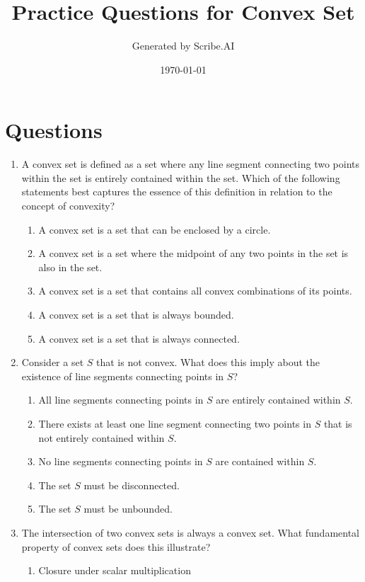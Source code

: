 \documentclass{article}%
\title{Practice Questions for Convex Set}%
\author{Generated by Scribe.AI}%
\date{\today}%
\begin{document}
%
\normalsize%
\maketitle%
\section{Questions}%
\label{sec:Questions}%
\begin{enumerate}%
\item A convex set is defined as a set where any line segment connecting two points within the set is entirely contained within the set.  Which of the following statements best captures the essence of this definition in relation to the concept of convexity?%
\begin{enumerate}%
\item A convex set is a set that can be enclosed by a circle.%
\item A convex set is a set where the midpoint of any two points in the set is also in the set.%
\item A convex set is a set that contains all convex combinations of its points.%
\item A convex set is a set that is always bounded.%
\item A convex set is a set that is always connected.%
\end{enumerate}%
\vspace{1em}%
\item Consider a set $S$ that is not convex. What does this imply about the existence of line segments connecting points in $S$?%
\begin{enumerate}%
\item All line segments connecting points in $S$ are entirely contained within $S$.%
\item There exists at least one line segment connecting two points in $S$ that is not entirely contained within $S$.%
\item No line segments connecting points in $S$ are contained within $S$.%
\item The set $S$ must be disconnected.%
\item The set $S$ must be unbounded.%
\end{enumerate}%
\vspace{1em}%
\item The intersection of two convex sets is always a convex set.  What fundamental property of convex sets does this illustrate?%
\begin{enumerate}%
\item Closure under scalar multiplication%

\end{enumerate}
\end{enumerate}
\end{document}
